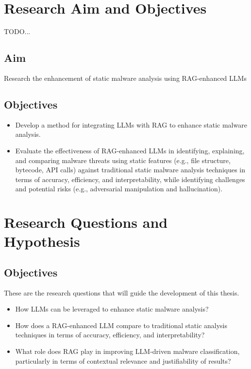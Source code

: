 \section{Research Aim and Objectives}
TODO...

\subsection{Aim}
Research the enhancement of static malware analysis using RAG-enhanced LLMs

\subsection{Objectives}
\begin{itemize}
	\item Develop a method for integrating LLMs with RAG to enhance static malware analysis.
	\item Evaluate the effectiveness of RAG-enhanced LLMs in identifying, explaining, and comparing malware
	      threats using static features (e.g., file structure, bytecode, API calls) against traditional
	      static malware analysis techniques in terms of accuracy, efficiency, and interpretability, while
	      identifying challenges and potential risks (e.g., adversarial manipulation and hallucination).
\end{itemize}

\section{Research Questions and Hypothesis}

\subsection{Objectives}
These are the research questions that will guide the development of this thesis.
\begin{itemize}
	\item How LLMs can be leveraged to enhance static malware analysis?
	\item How does a RAG-enhanced LLM compare to traditional static analysis techniques in terms of accuracy,
	      efficiency, and interpretability?
	\item What role does RAG play in improving LLM-driven malware classification, particularly in terms of
	      contextual relevance and justifiability of results?
\end{itemize}

